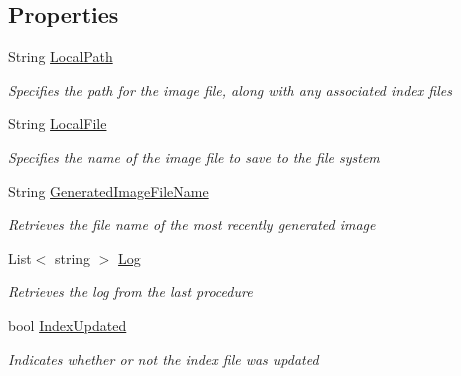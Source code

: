 \subsection*{Properties}
\begin{DoxyCompactItemize}
\item 
String \hyperlink{class_microchip_1_1_m_p_f_s_builder_aa396fc601d5eda5056c98ece9d06b262}{Local\+Path}
\begin{DoxyCompactList}\small\item\em Specifies the path for the image file, along with any associated index files \end{DoxyCompactList}\item 
String \hyperlink{class_microchip_1_1_m_p_f_s_builder_a26bf3056ff1696480b7019462a2b408d}{Local\+File}
\begin{DoxyCompactList}\small\item\em Specifies the name of the image file to save to the file system \end{DoxyCompactList}\item 
String \hyperlink{class_microchip_1_1_m_p_f_s_builder_aa5d595675bc1157c4418af50c2683023}{Generated\+Image\+File\+Name}
\begin{DoxyCompactList}\small\item\em Retrieves the file name of the most recently generated image \end{DoxyCompactList}\item 
List$<$ string $>$ \hyperlink{class_microchip_1_1_m_p_f_s_builder_a06712a1c8dec792865a961869c7acf59}{Log}
\begin{DoxyCompactList}\small\item\em Retrieves the log from the last procedure \end{DoxyCompactList}\item 
bool \hyperlink{class_microchip_1_1_m_p_f_s_builder_a944fdb01a06b9ef65786b8de57dcd97a}{Index\+Updated}
\begin{DoxyCompactList}\small\item\em Indicates whether or not the index file was updated \end{DoxyCompactList}\end{DoxyCompactItemize}


